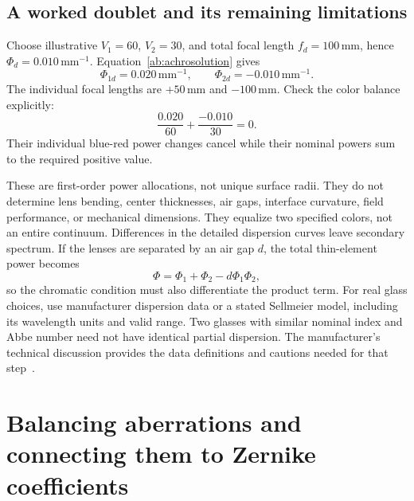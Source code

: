 \section{A worked doublet and its remaining limitations}
Choose illustrative $V_1=60$, $V_2=30$, and total focal length
$f_d=100\,\mathrm{mm}$, hence $\Phi_d=0.010\,\mathrm{mm}^{-1}$.
Equation~\eqref{ab:achrosolution} gives
\begin{equation}
 \Phi_{1d}=0.020\,\mathrm{mm}^{-1},\qquad
 \Phi_{2d}=-0.010\,\mathrm{mm}^{-1}.
\end{equation}
The individual focal lengths are $+50\,\mathrm{mm}$ and $-100\,\mathrm{mm}$.
Check the color balance explicitly:
\begin{equation}
 \frac{0.020}{60}+\frac{-0.010}{30}=0.
\end{equation}
Their individual blue-red power changes cancel while their nominal powers
sum to the required positive value.

These are first-order power allocations, not unique surface radii. They do
not determine lens bending, center thicknesses, air gaps, interface curvature,
field performance, or mechanical dimensions. They equalize two specified
colors, not an entire continuum. Differences in the detailed dispersion
curves leave secondary spectrum. If the lenses are separated by an air gap
$d$, the total thin-element power becomes
\begin{equation}
 \Phi=\Phi_1+\Phi_2-d\Phi_1\Phi_2,
\end{equation}
so the chromatic condition must also differentiate the product term.
For real glass choices, use manufacturer dispersion data or a stated
Sellmeier model, including its wavelength units and valid range. Two glasses
with similar nominal index and Abbe number need not have identical partial
dispersion. The manufacturer's technical discussion provides the data
definitions and cautions needed for that step~\cite{schottTIE29}.

\chapter{Balancing aberrations and connecting them to Zernike coefficients}
\label{ab:balance}

